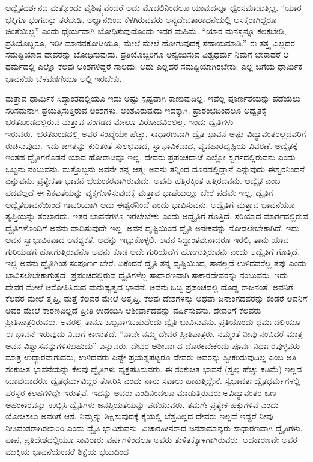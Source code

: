 \vskip 0.2cm 

ಅದ್ವೈತದರ್ಶನದ ಮತ್ತೊಂದು ವೈಶಿಷ್ಟ್ಯವೆಂದರೆ ಅದು ಮೊದಲಿನಿಂದಲೂ ಯಾವುದನ್ನೂ ಧ್ವಂಸಮಾಡುತ್ತಿಲ್ಲ. “ಯಾರ ಭಕ್ತಿಗೂ ಭಂಗವನ್ನು ತರಬೇಡಿ. ಅಜ್ಞಾನದಿಂದ ಕೆಳಗಿರುವವರು ಅನ್ಯದೇವತಾರಾಧನೆಯಲ್ಲಿ ಆಸಕ್ತರಾಗಿದ್ದರೂ ಚಿಂತೆಯಿಲ್ಲ” ಎಂದು ಧೈರ್ಯವಾಗಿ ಬೋಧಿಸುವುದೊಂದು ಇದರ ಮಹಿಮೆ. “ಯಾರ ಮನಸ್ಸನ್ನೂ ಕಲಕಬೇಡಿ, ಪ್ರತಿಯೊಬ್ಬರೂ, ಇಡೀ ಮಾನವಕೋಟಿಯೂ, ಮೇಲೆ ಮೇಲೆ ಹೋಗುವುದಕ್ಕೆ ಸಹಾಯಮಾಡಿ.” ಈ ತತ್ತ್ವ ಎಲ್ಲದರ ಸಮಷ್ಟಿಯಾದ ದೇವರನ್ನು ಬೋಧಿಸುವುದು. ಪ್ರತಿಯೊಬ್ಬರಿಗೂ ಅನ್ವಯಿಸುವ ವಿಶ್ವಧರ್ಮ ನಿಮಗೆ ಬೇಕಾದರೆ ಆ ಧರ್ಮದಲ್ಲಿ ಎಲ್ಲೊ ಕೆಲವು ಅಂಶಗಳಿದ್ದರೆ ಸಾಲದು; ಅದು ಎಲ್ಲದರ ಸಮಷ್ಟಿಯಾಗಿರಬೇಕು; ಎಲ್ಲ ಬಗೆಯ ಧಾರ್ಮಿಕ ಭಾವನೆಯ ಬೆಳವಣಿಗೆಯೂ ಅಲ್ಲಿ ಇರಬೇಕು.

\vskip 0.2cm 

ಮತ್ತಾವ ಧಾರ್ಮಿಕ ಸಿದ್ಧಾಂತದಲ್ಲಿಯೂ ಇದು ಅಷ್ಟು ಸ್ಪಷ್ಟವಾಗಿ ಕಾಣುವುದಿಲ್ಲ. ಇವೆಲ್ಲ ಪೂರ್ಣತೆಯನ್ನು ಪಡೆಯಲು ಸರಿಸಮನಾಗಿ ಪ್ರಯತ್ನಿಸುತ್ತಿರುವ ಅಂಶಗಳು. ಅಂಶವಿರುವುದು ಇದಕ್ಕಾಗಿ. ಪ್ರಾರಂಭದಿಂದಲೂ ಅದ್ವೈತಕ್ಕೆ ಭರತಖಂಡದಲ್ಲಿರುವ ಮತ್ತಾವ ಪಂಗಡದ ಮೇಲೂ ವಿರೋಧವಿರಲಿಲ್ಲ. ಇಂದು ದ್ವೈತಿಗಳು ಇರುವರು.\break\ ಭರತಖಂಡದಲ್ಲಿ ಅವರ ಸಂಖ್ಯೆಯೇ ಹೆಚ್ಚು. ಸಾಧಾರಣವಾಗಿ ದ್ವೈತ ಭಾವನೆ ಅಷ್ಟು ವಿದ್ಯಾವಂತರಲ್ಲದವರಿಗೆ ರುಚಿಸುವುದು. ಇದು ಜಗತ್ತನ್ನು ಕುರಿತಂತೆ ಸುಲಭವಾದ, ಸ್ವಾಭಾವಿಕವಾದ, ವ್ಯವಹಾರದೃಷ್ಟಿಯ ವಿವರಣೆ. ಅದ್ವೈತಕ್ಕೆ ಇಂತಹ ದ್ವೈತಿಗಳೊಡನೆ ಯಾವ ಹೋರಾಟವೂ ಇಲ್ಲ. ದೇವರು ಪ್ರಪಂಚದಾಚೆ ಎಲ್ಲೋ ಸ್ವರ್ಗದಲ್ಲಿರುವನು ಎಂದು ಒಬ್ಬನು ನಂಬುವನು. ಮತ್ತೊಬ್ಬನು ಅವನೇ ತನ್ನ ಆತ್ಮ; ಅವನು ತನ್ನಿಂದ ದೂರದಲ್ಲಿದ್ದಾನೆ ಎನ್ನುವುದು ಈಶ್ವರನಿಂದನೆ ಎನ್ನುವನು. ಪ್ರತ್ಯೇಕತಾ ಭಾವನೆ ಭಯಂಕರವಾಗಿರುವುದು. ಅವನು ಹತ್ತಿರಕ್ಕಿಂತ ಹತ್ತಿರದವನು. ಅದ್ವೈತ ಎಂಬ ಪದವಲ್ಲದೆ ಈ ನಿಕಟತೆಯನ್ನು ವ್ಯಕ್ತಗೊಳಿಸುವುದಕ್ಕೆ ಮತ್ತಾವ ಭಾಷೆಯಲ್ಲೂ ಬೇರೆ ಪದವೇ ಇಲ್ಲ. ದ್ವೈತಿಗೆ ಅದ್ವೈತಭಾವನೆಯಿಂದ ಗಾಬರಿಯಾಗಿ ಅದು ಈಶ್ವರನಿಂದೆ ಎಂದು ಭಾವಿಸುವನು. ಅದ್ವೈತಿಗೆ ಮತ್ತಾವ ಭಾವನೆಯೂ ತೃಪ್ತಿಯನ್ನು ತರಲಾರದು. ಇತರ ಭಾವನೆಗಳೂ ಇರಲೇಬೇಕು ಎಂದು ಅದ್ವೈತಿಗೆ ಗೊತ್ತಿದೆ. ಸರಿಯಾದ ಮಾರ್ಗದಲ್ಲಿರುವ ದ್ವೈತಿಗಳೊಂದಿಗೆ ಅವನು ವಾದಿಸುವುದೇ ಇಲ್ಲ. ಅವನ ದೃಷ್ಟಿಯಿಂದ ದ್ವೈತಿ ಅನೇಕವನ್ನು ನೋಡಲೇಬೇಕಾಗಿದೆ. ಇದು ಅವನ ಸ್ವಾಭಾವಿಕವಾದ ಆವಶ್ಯಕತೆ. ಅದನ್ನು ಇಟ್ಟುಕೊಳ್ಳಲಿ. ಅವನ ಸಿದ್ಧಾಂತವೇನಾದರೂ ಇರಲಿ, ತಾನು ಯಾವ ಗುರಿಯೆಡೆಗೆ ಹೋಗುತ್ತಿರುವನೊ ಅವನು ಕೂಡ ಅದೇ ಗುರಿಯೆಡೆಗೆ ಹೋಗುತ್ತಿರುವನು ಎಂದು ಅದ್ವೈತಿಗೆ ಗೊತ್ತಿದೆ. ಇಲ್ಲಿ ಅವನು ದ್ವೈತಿಗಿಂತ ಸಂಪೂರ್ಣ ಬೇರೆ. ಏಕೆಂದರೆ ದ್ವೈತಿ ತನ್ನ ದೃಷ್ಟಿಯಿಂದ, ತಾನಲ್ಲದೆ ಉಳಿದವರೆಲ್ಲ ತಪ್ಪು ಎಂದು ಭಾವಿಸಲೇಬೇಕಾಗುತ್ತದೆ. ಪ್ರಪಂಚದಲ್ಲಿರುವ ದ್ವೈತಿಗಳೆಲ್ಲ ಸಾಧಾರಣವಾಗಿ ಸಾಕಾರದೇವರನ್ನು ನಂಬುವರು. ಇದು ದೇವರ ಮೇಲೆ ಆರೋಪಿಸಿರುವ ಮನುಷ್ಯತ್ವದ ಭಾವನೆ. ಅವನು ಒಬ್ಬ ಪ್ರಪಂಚದಲ್ಲಿ ದೊಡ್ಡ ರಾಜನಂತೆ. ಅವನಿಗೆ ಕೆಲವರ ಮೇಲೆ ತೃಪ್ತಿ, ಮತ್ತೆ ಕೆಲವರ ಮೇಲೆ ಅತೃಪ್ತಿ. ಕೆಲವು ದೇಶಗಳನ್ನು ಅಥವಾ ಜನಾಂಗದವರನ್ನು ಕಂಡರೆ ಅವನಿಗೆ ಅವರ ಮೇಲೆ ಕಾರಣವಿಲ್ಲದೆ ಪ್ರೀತಿ ಉದಯಿಸಿ ಆಶೀರ್ವಾದವನ್ನು ವರ್ಷಿಸುವನು. ದೇವರಿಗೆ ಕೆಲವರು ಪ್ರೀತಿಪಾತ್ರರಿರುವರು. ಅವರಲ್ಲಿ ತಾನೂ ಒಬ್ಬನಾಗಬಹುದೆಂದು ದ್ವೈತಿ ಭಾವಿಸುವನು. ಪ್ರತಿಯೊಂದು ಧರ್ಮದಲ್ಲಿಯೂ ಈ ಭಾವನೆ ಇರುವುದು ನಿಮಗೆ ಕಾಣುತ್ತದೆ. “ನಾವೇ ನಮ್ಮ ದೇವರ ಪ್ರೀತಿಪಾತ್ರರು. ನಮ್ಮಂತೆ ನೀವು ನಂಬಿದರೆ ಮಾತ್ರ ಅವನ ವಿಶ್ವಾಸವನ್ನುಗಳಿಸಬಹುದು” ಎನ್ನುವರು. ದೇವರ ಆಶೀರ್ವಾದ ದೊರಕಬೇಕೆಂದು ಪೂರ್ವ ನಿರ್ಧಾರವುಳ್ಳವರು ಮಾತ್ರ ಉದ್ಧಾರವಾಗುವರು, ಉಳಿದವರು ಎಷ್ಟೇ ಪ್ರಯತ್ನಪಟ್ಟರೂ ದೇವರು ಅವರನ್ನು ಸ್ವೀಕರಿಸುವುದಿಲ್ಲ ಎಂಬ ಅತಿ ಸಂಕುಚಿತ ಭಾವನೆಯನ್ನು ಕೆಲವು ದ್ವೈತಿಗಳು ವ್ಯಕ್ತಪಡಿಸುವರು. ಈ ಸಂಕುಚಿತ ಭಾವನೆ (ಸ್ವಲ್ಪ ಹೆಚ್ಚು ಕಡಿಮೆ) ಇಲ್ಲದ ಯಾವುದಾದರೂ ದ್ವೈತಧರ್ಮವಿದ್ದರೆ ತೋರಿಸಿ ಎಂದು ನಾನು ಸವಾಲು ಹಾಕುತ್ತಿದ್ದೇನೆ. ಸ್ವಭಾವತಃ ದ್ವೈತಧರ್ಮಗಳಲ್ಲಿ ಪರಸ್ಪರ ಕಲಹಗಳಿದ್ದೇ ಇರುತ್ತವೆ. ಇದನ್ನು ಅವರು ಎಂದಿನಿಂದಲೂ ಮಾಡುತ್ತಿರುವರು.\break ಅವಿದ್ಯಾವಂತರ ಒಣ ಅಹಂಕಾರವನ್ನು ಉಬ್ಬಿಸಿ ದ್ವೈತಿಗಳು ಜನಪ್ರಿಯತೆಯನ್ನು ಪಡೆಯುವರು. ತಮಗೇ ಪ್ರತ್ಯೇಕ ಹಕ್ಕುಗಳಿವೆ ಎಂದು ಯೋಚಿಸಲು ಅವರಿಗೆ ಆಸೆ. ನಿಮ್ಮನ್ನು ಶಿಕ್ಷಿಸುವುದಕ್ಕೆ ಕೈಯಲ್ಲಿ ಬೆತ್ತವಿಲ್ಲದ ದೇವರು ಇಲ್ಲದೆ ಇದ್ದರೆ ನೀವು ನೀತಿವಂತರಾಗಿರಲಾರಿರಿ ಎಂದು ದ್ವೈತಿ ಭಾವಿಸುವನು. ವಿಚಾರಹೀನರಾದ ಜನಸಾಮಾನ್ಯರು ಸಾಧಾರಣವಾಗಿ ದ್ವೈತಿಗಳು. ಪಾಪ, ಪ್ರತಿದೇಶದಲ್ಲಿಯೂ ಸಾವಿರಾರು ವರ್ಷಗಳಿಂದಲೂ ಅವರು ತುಳಿತಕ್ಕೊಳಗಾಗಿರುವರು. ಆದಕಾರಣವೇ ಅವರ ಮುಕ್ತಿಯ ಭಾವನೆಯೆಂದರೆ ಶಿಕ್ಷೆಯ ಭಯದಿಂದ 